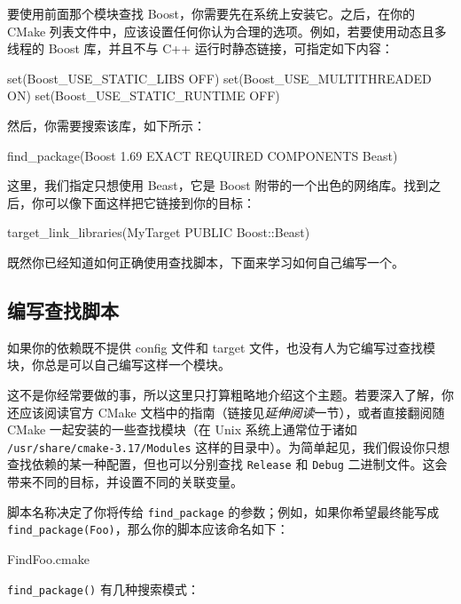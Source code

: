 要使用前面那个模块查找 Boost，你需要先在系统上安装它。之后，在你的 CMake 列表文件中，应该设置任何你认为合理的选项。例如，若要使用动态且多线程的 Boost 库，并且不与 C++ 运行时静态链接，可指定如下内容：

\begin{codebox}[cmake]
set(Boost_USE_STATIC_LIBS OFF)
set(Boost_USE_MULTITHREADED ON)
set(Boost_USE_STATIC_RUNTIME OFF)
\end{codebox}

然后，你需要搜索该库，如下所示：

\begin{codebox}[cmake]
find_package(Boost 1.69 EXACT REQUIRED COMPONENTS Beast)
\end{codebox}

这里，我们指定只想使用 Beast，它是 Boost 附带的一个出色的网络库。找到之后，你可以像下面这样把它链接到你的目标：

\begin{codebox}[cmake]
target_link_libraries(MyTarget PUBLIC Boost::Beast)
\end{codebox}

既然你已经知道如何正确使用查找脚本，下面来学习如何自己编写一个。

\subsection{编写查找脚本}

\label{idx:684}
\label{idx:685}
如果你的依赖既不提供 config 文件和 target 文件，也没有人为它编写过查找模块，你总是可以自己编写这样一个模块。

这不是你经常要做的事，所以这里只打算粗略地介绍这个主题。若要深入了解，你还应该阅读官方 CMake 文档中的指南（链接见\emph{延伸阅读}一节），或者直接翻阅随 CMake 一起安装的一些查找模块（在 Unix 系统上通常位于诸如 \texttt{/\allowbreak{}usr/\allowbreak{}share/\allowbreak{}cmake-3.\allowbreak{}17/\allowbreak{}Modules} 这样的目录中）。为简单起见，我们假设你只想查找依赖的某一种配置，但也可以分别查找 \texttt{Release} 和 \texttt{Debug} 二进制文件。这会带来不同的目标，并设置不同的关联变量。

脚本名称决定了你将传给 \texttt{find\_\allowbreak{}package} 的参数；例如，如果你希望最终能写成 \texttt{find\_\allowbreak{}package(\allowbreak{}Foo)\allowbreak{}}，那么你的脚本应该命名如下：

\begin{codebox}[text]
FindFoo.cmake
\end{codebox}

\texttt{find\_\allowbreak{}package(\allowbreak{})\allowbreak{}} 有几种搜索模式：

